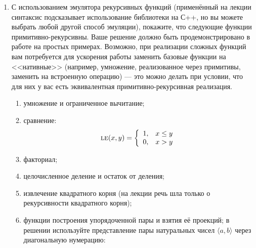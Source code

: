 \documentclass[10pt,a4paper,oneside]{article}
\begin{document}
\begin{enumerate}
\item С использованием эмулятора рекурсивных функций (применённый на лекции синтаксис
подсказывает использование библиотеки на С++, но вы можете выбрать любой другой способ эмуляции),
покажите, что следующие функции примитивно-рекурсивны. Ваше решение должно быть продемонстрировано
в работе на простых примерах. Возможно, при реализации сложных функций вам потребуется 
для ускорения работы заменить базовые функции на <<нативные>> (например, умножение, реализованное
через примитивы, заменить на встроенную операцию) --- это можно делать при условии, что для них у вас есть 
эквивалентная примитивно-рекурсивная реализация.
\begin{enumerate}
\item умножение и ограниченное вычитание;
\item сравнение: $$\textsc{le}(x,y)=\left\{\begin{array}{ll}1,&x \le y\\0,&x > y\end{array}\right.$$
\item факториал;
\item целочисленное деление и остаток от деления;
\item извлечение квадратного корня (на лекции речь шла только о рекурсивности квадратного корня);
\item функции построения упорядоченной пары и взятия её проекций; в решении используйте представление пары натуральных
чисел $\langle a,b\rangle$ через диагональную нумерацию:


\end{enumerate}
\end{enumerate}
\end{document}
